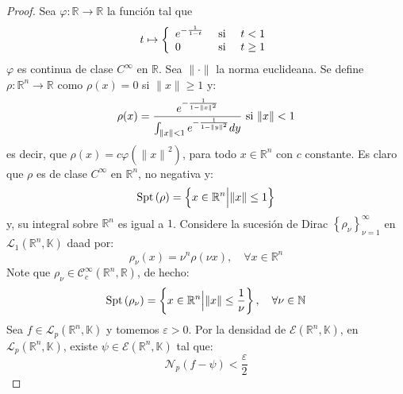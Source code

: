 \documentclass[12pt]{report}
\theoremstyle{largebreak}
\newcommand\cf[3]{\ensuremath{#1:#2\rightarrow#3}}
\newcommand\norm[1]{\ensuremath{\|#1\|}}
\newcommand{\N}[2]{\ensuremath{\mathcal{N}_{#1}\left(#2\right)}}
\newcommand{\Spt}[1]{\ensuremath{\textup{Spt}\left(#1\right)}}
\begin{document}
    \begin{proof}
        Sea $\cf{\varphi}{\mathbb{R}}{\mathbb{R}}$ la función tal que
        \begin{equation*}
            t\mapsto\left\{
                \begin{array}{lcr}
                    e^{-\frac{1}{1-t}} & \textup{ si } & t<1\\
                    0 & \textup{ si }& t\geq 1\\
                \end{array}
            \right.
        \end{equation*}
        $\varphi$ es continua de clase $C^\infty$ en $\mathbb{R}$. Sea $\norm{\cdot}$ la norma euclideana. Se define $\cf{\rho}{\mathbb{R}^n}{\mathbb{R}}$ como $\rho(x)=0$ si $\norm{x}\geq 1$ y:
        \begin{equation*}
            \rho(x)=\frac{e^{-\frac{1}{1-\norm{x}^2}}}{\int_{\norm{x}<1}e^{-\frac{1}{1-\norm{y}^2}}dy}\textup{ si }\norm{x}<1
        \end{equation*}
        es decir, que $\rho(x)=c\varphi(\norm{x}^2)$, para todo $x\in\mathbb{R}^n$ con $c$ constante. Es claro que $\rho$ es de clase $C^\infty$ en $\mathbb{R}^n$, no negativa y:
        \begin{equation*}
            \Spt{\rho}=\left\{x\in\mathbb{R}^n\Big|\norm{x}\leq1 \right\}
        \end{equation*}
        y, su integral sobre $\mathbb{R}^n$ es igual a $1$. Considere la sucesión de Dirac $\left\{\rho_\nu \right\}_{\nu=1}^\infty$ en $\mathcal{L}_1(\mathbb{R}^n,\mathbb{K})$ daad por:
        \begin{equation*}
            \rho_\nu(x)=\nu^n\rho(\nu x),\quad\forall x\in\mathbb{R}^n
        \end{equation*}
        Note que $\rho_\nu\in\mathcal{C}_c^\infty(\mathbb{R}^n,\mathbb{R})$, de hecho:
        \begin{equation*}
            \Spt{\rho_\nu}=\left\{x\in\mathbb{R}^n\Big|\norm{x}\leq\frac{1}{\nu} \right\},\quad\forall\nu\in\mathbb{N}
        \end{equation*}
        Sea $f\in\mathcal{L}_p(\mathbb{R}^n,\mathbb{K})$ y tomemos $\varepsilon>0$. Por la densidad de $\mathcal{E}(\mathbb{R}^n,\mathbb{K})$, en $\mathcal{L}_p(\mathbb{R}^n,\mathbb{K})$, existe $\psi\in\mathcal{E}(\mathbb{R}^n,\mathbb{K})$ tal que:
        \begin{equation*}
            \N{p}{f-\psi}<\frac{\varepsilon}{2}
        \end{equation*}

\end{proof}
\end{document}
